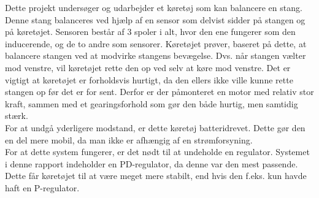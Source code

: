 Dette projekt undersøger og udarbejder et køretøj som kan balancere en stang. Denne stang balanceres ved hjælp af en sensor som delvist sidder på stangen og på køretøjet. Sensoren består af 3 spoler i alt, hvor den ene fungerer som den inducerende, og de to andre som sensorer. Køretøjet prøver, baseret på dette, at balancere stangen ved at modvirke stangens bevægelse. Dvs. når stangen vælter mod venstre, vil køretøjet rette den op ved selv at køre mod venstre. Det er vigtigt at køretøjet er forholdsvis hurtigt, da den ellers ikke ville kunne rette stangen op før det er for sent. Derfor er der påmonteret en motor med relativ stor kraft, sammen med et gearingsforhold som gør den både hurtig, men samtidig stærk. \\

For at undgå yderligere modstand, er dette køretøj batteridrevet. Dette gør den en del mere mobil, da man ikke er afhængig af en strømforsyning. \\

For at dette system fungerer, er det nødt til at undeholde en regulator. Systemet i denne rapport indeholder en PD-regulator, da denne var den mest passende. Dette får køretøjet til at være meget mere stabilt, end hvis den f.eks. kun havde haft en P-regulator. \\

